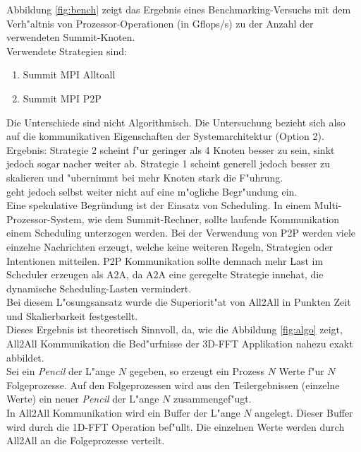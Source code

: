 Abbildung \ref{fig:bench} zeigt das Ergebnis eines Benchmarking-Versuchs mit dem Verh"altnis von Prozessor-Operationen (in Gflops/s) zu der Anzahl der verwendeten Summit-Knoten.\\
Verwendete Strategien sind:
\begin{enumerate}
	\item Summit MPI Alltoall
	\item Summit MPI P2P
\end{enumerate}
Die Unterschiede sind nicht Algorithmisch. Die Untersuchung bezieht sich also auf die kommunikativen Eigenschaften der Systemarchitektur (Option 2).\\
Ergebnis: Strategie 2 scheint f"ur geringer als 4 Knoten besser zu sein, sinkt jedoch sogar nacher weiter ab.
Strategie 1 scheint generell jedoch besser zu skalieren und "ubernimmt bei mehr Knoten stark die F"uhrung.\\
\cite{mainpaper} geht jedoch selbst weiter nicht auf eine m"ogliche Begr"undung ein.\\
Eine spekulative Begründung ist der Einsatz von Scheduling. In einem Multi-Prozessor-System, wie dem Summit-Rechner, sollte laufende Kommunikation einem Scheduling unterzogen werden. Bei der Verwendung von P2P werden viele einzelne Nachrichten erzeugt, welche keine weiteren Regeln, Strategien oder Intentionen mitteilen. P2P Kommunikation sollte demnach mehr Last im Scheduler erzeugen als A2A, da A2A eine geregelte Strategie innehat, die dynamische Scheduling-Lasten vermindert.\\
Bei diesem L"osungsansatz wurde die Superiorit"at von All2All in Punkten Zeit und Skalierbarkeit festgestellt.\\
Dieses Ergebnis ist theoretisch Sinnvoll, da, wie die Abbildung \ref{fig:algo} zeigt, All2All Kommunikation die Bed"urfnisse der 3D-FFT Applikation nahezu exakt abbildet.\\
Sei ein \textit{Pencil} der L"ange $N$ gegeben, so erzeugt ein Prozess $N$ Werte f"ur $N$ Folgeprozesse. Auf den Folgeprozessen wird aus den Teilergebnissen (einzelne Werte) ein neuer \textit{Pencil} der L"ange $N$ zusammengef"ugt.\\
In All2All Kommunikation wird ein Buffer der L"ange $N$ angelegt. Dieser Buffer wird durch die 1D-FFT Operation bef"ullt. Die einzelnen Werte werden durch All2All an die Folgeprozesse verteilt.


